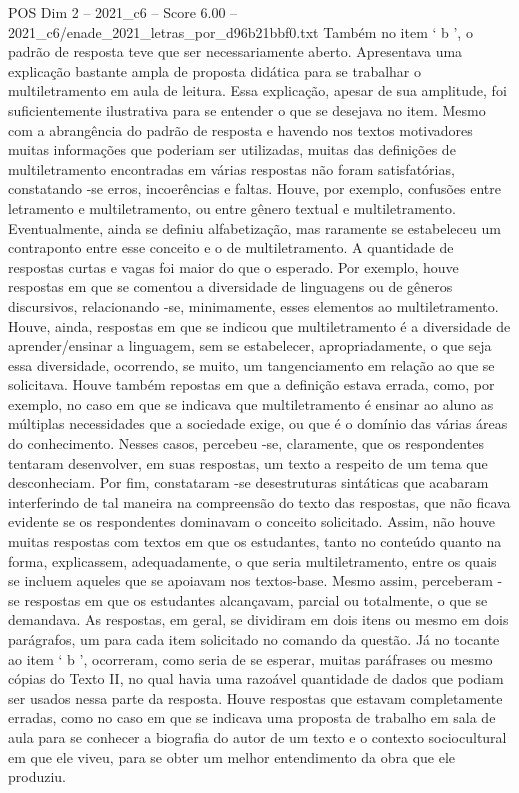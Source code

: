 \begin{textsample}{POS Dim 2 – 2021\_c6 – Score 6.00 – 2021\_c6/enade\_2021\_letras\_por\_d96b21bbf0.txt}
Também no item ‘ b ’, o padrão de resposta teve que ser necessariamente aberto.
Apresentava uma explicação bastante ampla de proposta didática para se trabalhar o multiletramento em aula de leitura.
Essa explicação, apesar de sua amplitude, foi suficientemente ilustrativa para se entender o que se desejava no item.
Mesmo com a abrangência do padrão de resposta e havendo nos textos motivadores muitas informações que poderiam ser utilizadas, muitas das definições de multiletramento encontradas em várias respostas não foram satisfatórias, constatando -se erros, incoerências e faltas.
Houve, por exemplo, confusões entre letramento e multiletramento, ou entre gênero textual e multiletramento.
Eventualmente, ainda se definiu alfabetização, mas raramente se estabeleceu um contraponto entre esse conceito e o de multiletramento.
A quantidade de respostas curtas e vagas foi maior do que o esperado.
Por exemplo, houve respostas em que se comentou a diversidade de linguagens ou de gêneros discursivos, relacionando -se, minimamente, esses elementos ao multiletramento.
Houve, ainda, respostas em que se indicou que multiletramento é a diversidade de aprender/ensinar a linguagem, sem se estabelecer, apropriadamente, o que seja essa diversidade, ocorrendo, se muito, um tangenciamento em relação ao que se solicitava.
Houve também repostas em que a definição estava errada, como, por exemplo, no caso em que se indicava que multiletramento é ensinar ao aluno as múltiplas necessidades que a sociedade exige, ou que é o domínio das várias áreas do conhecimento.
Nesses casos, percebeu -se, claramente, que os respondentes tentaram desenvolver, em suas respostas, um texto a respeito de um tema que desconheciam.
Por fim, constataram -se desestruturas sintáticas que acabaram interferindo de tal maneira na compreensão do texto das respostas, que não ficava evidente se os respondentes dominavam o conceito solicitado.
Assim, não houve muitas respostas com textos em que os estudantes, tanto no conteúdo quanto na forma, explicassem, adequadamente, o que seria multiletramento, entre os quais se incluem aqueles que se apoiavam nos textos-base.
Mesmo assim, perceberam -se respostas em que os estudantes alcançavam, parcial ou totalmente, o que se demandava.
As respostas, em geral, se dividiram em dois itens ou mesmo em dois parágrafos, um para cada item solicitado no comando da questão.
Já no tocante ao item ‘ b ’, ocorreram, como seria de se esperar, muitas paráfrases ou mesmo cópias do Texto II, no qual havia uma razoável quantidade de dados que podiam ser usados nessa parte da resposta.
Houve respostas que estavam completamente erradas, como no caso em que se indicava uma proposta de trabalho em sala de aula para se conhecer a biografia do autor de um texto e o contexto sociocultural em que ele viveu, para se obter um melhor entendimento da obra que ele produziu.

\end{textsample}
